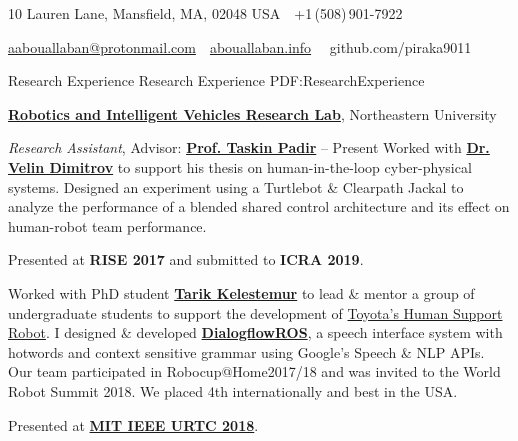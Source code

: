 \documentclass[letterpaper,MMMyyyy,nonstopmode]{simpleresumecv}
\newcommand{\CVAuthor}{Anas Abou Allaban}
\newcommand{\CVWebpage}{abouallaban.info}
\begin{document}

\Title{\CVAuthor}

\begin{SubTitle}
10 Lauren Lane, Mansfield, MA, 02048 USA
\,\SubBulletSymbol\,
+1\,(508)\,901-7922
\par
\href{mailto:aabouallaban@protonmail.com}
{aabouallaban@protonmail.com}
\,\SubBulletSymbol\,
\href{\CVWebpage}
{\url{\CVWebpage}}
\, \SubBulletSymbol\,
github.com/piraka9011
\end{SubTitle}

\begin{Body}



\Section
{Research Experience}
{Research Experience}
{PDF:ResearchExperience}

\Entry
\href{http://robot.neu.edu/}
{\textbf{Robotics and Intelligent Vehicles Research Lab}},
Northeastern University

\Gap
\textit{Research Assistant}, Advisor: 
\href{tpadir.info}{\textbf{Prof. Taskin Padir}}
\hfill
{} -- Present
\BulletItem 
Worked with \textbf{\href{https://www.linkedin.com/in/velin-dimitrov/}{Dr. Velin Dimitrov}} to support his thesis on human-in-the-loop cyber-physical systems. Designed an experiment using a Turtlebot \& Clearpath Jackal to analyze the performance of a blended shared control architecture and its effect on human-robot team performance.
\begin{Detail}
	\Item
	Presented at \textbf{RISE 2017} and submitted to \textbf{ICRA 2019}.
\end{Detail}
\BulletItem 
Worked with PhD student \href{http://kelestemur.com/}{\textbf{Tarik Kelestemur}} to lead \& mentor a group of undergraduate students to support the development of \href{http://www.toyota-global.com/innovation/partner_robot/family_2.html}{Toyota's Human Support Robot}. I designed \& developed \href{http://wiki.ros.org/dialogflow_ros}{\textbf{DialogflowROS}}, a speech interface system with hotwords and context sensitive grammar using Google's Speech \& NLP APIs. Our team participated in Robocup@Home2017/18 and was invited to the World Robot Summit 2018. We placed 4th internationally and best in the USA.
\begin{Detail}
	\Item
	Presented at \href{http://ieee.scripts.mit.edu/conference/}{\textbf{MIT IEEE URTC 2018}}.
\end{Detail}
\SectionSpace


\end{Body}
\end{document}
